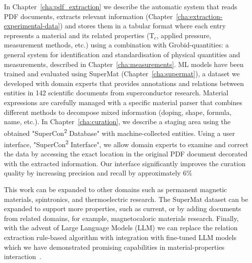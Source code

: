 \documentclass[a4paper,11pt]{report}
\newcommand{\tc}{T$_{c}$}
\begin{document}
In Chapter~\ref{cha:pdf_extraction} we describe the automatic system that reads PDF documents, extracts relevant information (Chapter~\ref{cha:extraction-experimental-data}) and stores them in a tabular format where each entry represents a material and its related properties (\tc, applied pressure, measurement methods, etc.) using a combination with Grobid-quantities: a general system for identification and standardisation of physical quantities and measurements, described in Chapter~\ref{cha:measurements}.
ML models have been trained and evaluated using SuperMat (Chapter~\ref{cha:supermat}), a dataset we developed with domain experts that provides annotations and relations between entities in 142 scientific documents from superconductor research.
Material expressions are carefully managed with a specific material parser that combines different methods to decompose mixed information (doping, shape, formula, name, etc.). 
In Chapter~\ref{cha:curation}, we describe a staging area using the obtained "SuperCon\textsuperscript{2} Database" with machine-collected entities. Using a user interface, "SuperCon\textsuperscript{2} Interface", we allow domain experts to examine and correct the data by accessing the exact location in the original PDF document decorated with the extracted information. 
Our interface significantly improves the curation quality by increasing precision and recall by approximately 6\% %

This work can be expanded to other domains such as permanent magnetic materials, spintronics, and thermoelectric research. 
The SuperMat dataset can be expanded to support more properties, such as current, or by adding documents from related domains, for example, magnetocaloric materials research. 
Finally, with the advent of Large Language Models (LLM) we can replace the relation extraction rule-based algorithm with integration with fine-tuned LLM models which we have demonstrated promising capabilities in material-properties interaction~\cite{foppiano2024mining}. 


\newpage

{}



\newpage

{}

\end{document}
